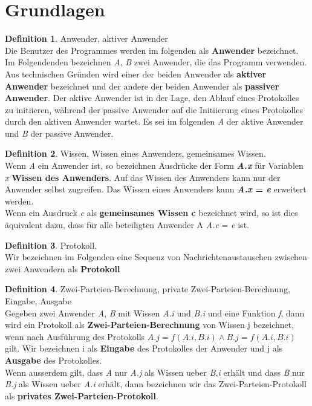 \documentclass{article}
\newcommand{\defined}[1]{{\bf #1}}
\newcommand{\var}[1]{{\em #1}}
\theoremstyle{definition}
\newtheorem{definition}{Definition}
\theoremstyle{remark}
\begin{document}
\section{Grundlagen}
\begin{definition}
Anwender, aktiver Anwender\\
Die Benutzer des Programmes werden im folgenden als \defined{Anwender} bezeichnet.
  Im Folgendenden bezeichnen \var{A}, \var{B} zwei Anwender, die das Programm 
verwenden.\\
  Aus technischen Gr\"unden wird einer der beiden Anwender als 
\defined{aktiver Anwender} bezeichnet und der andere der beiden Anwender als
\defined{passiver Anwender}. Der aktive Anwender ist in der Lage, den Ablauf
eines Protokolles zu initiieren, w\"ahrend der passive Anwender auf die 
Initiierung eines Protokolles durch den aktiven Anwender wartet. Es sei im
folgenden \var{A} der aktive Anwender und \var{B} der passive Anwender.
\end{definition}

\begin{definition}
Wissen, Wissen eines Anwenders, gemeinsames Wissen.\\
Wenn \var{A} ein Anwender ist, so bezeichnen Ausdr\"ucke der Form 
\defined{\var{A.x}} f\"ur Variablen \var{x} \defined{Wissen des Anwenders}. 
Auf das Wissen des Anwenders kann nur der Anwender selbst zugreifen.
Das Wissen eines Anwenders kann \defined{\var{A.x} = \var{e}} erweitert werden.\\
Wenn ein Ausdruck \var{e} als \defined{gemeinsames Wissen c} bezeichnet wird, 
so ist dies \"aquivalent dazu, dass f\"ur alle beteiligten Anwender 
A \var{A.c} = \var{e} ist.
\end{definition}

\begin{definition}
Protokoll.\\
Wir bezeichnen im Folgenden eine Sequenz von Nachrichtenaustauschen zwischen
zwei Anwendern als \defined{Protokoll}
\end{definition}

\begin{definition}
Zwei-Parteien-Berechnung, private Zwei-Parteien-Berechnung, Eingabe, Ausgabe\\
Gegeben zwei Anwender \var{A}, \var{B} mit Wissen \var{A.i} und \var{B.i}
und eine Funktion \var{f}, dann wird ein Protokoll als
\defined{Zwei-Parteien-Berechnung} von Wissen j bezeichnet, wenn nach 
Ausf\"uhrung des Protokolls  \(A.j = f(A.i, B.i) \wedge B.j = f(A.i, B.i) \)
gilt. Wir bezeichnen i als \defined{Eingabe} des Protokolles der Anwender
und j als \defined{Ausgabe} des Protokolles.\\
Wenn ausserdem gilt, dass \var{A} nur \var{A.j} als Wissen ueber \var{B.i}
erh\"alt und dass \var{B} nur \var{B.j} als Wissen ueber \var{A.i} erh\"alt,
dann bezeichnen wir das Zwei-Parteien-Protokoll als \defined{privates
Zwei-Parteien-Protokoll}.
\end{definition}
\end{document}
